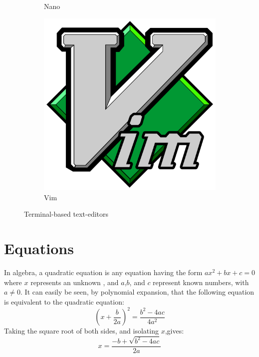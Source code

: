 \documentclass[a4paper]{article}
\begin{document}
\begin{figure}[h!]
\begin{subfigure}{0.3\linewidth}
		\caption{Nano}
	\end{subfigure}
	\begin{subfigure}{0.3\linewidth}
		\includegraphics[scale=0.1,width = \linewidth]{vimlogo.png}
		\caption{Vim}
	\end{subfigure}
	
	\caption{Terminal-based text-editors}
	\label{ides}
\end{figure}
\section{Equations}
In algebra,
a quadratic equation is any equation having the form
$ax^2+bx+c= 0$ where $x$ represents an unknown
, and $a$,$b$, and $c$ represent known numbers,
 with  $a \neq 0$.   It  can  easily  be  seen, 
  by  polynomial  expansion,  that  the  following 
  equation is equivalent to the quadratic equation:
\begin{equation*}
	\left(x + \frac{b}{2a}\right)^2 = \frac{b^2 - 4ac}{4a^2}
\end{equation*}
Taking the square root of both sides, and isolating $x$,gives:
\begin{equation}
	x = \frac{-b+\sqrt{b^2-4ac}}{2a}
\end{equation}
\end{document}

